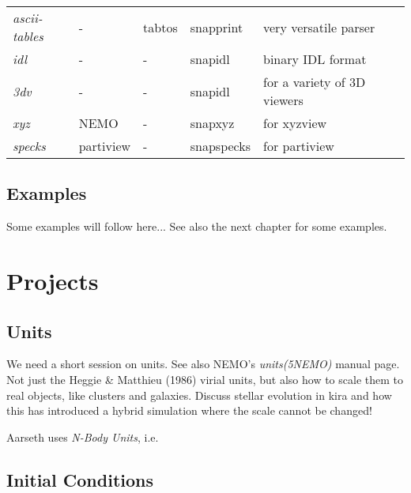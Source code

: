 \begin{center}
\begin{table}[h!]
\begin{tabular}{||l|l|l|l|l|l||}
{\it ascii-tables}   &   -   &  tabtos    &    snapprint     &   very versatile parser\\

{\it idl}         &    -     &     -      &    snapidl        &   binary IDL format  \\
{\it 3dv}         &    -     &     -      &    snapidl        &   for a variety of 3D viewers \\
{\it xyz}         &   NEMO    &     -      &    snapxyz        &  for xyzview \\
{\it specks}      &  partiview &     -      &    snapspecks      &  for partiview \\







\hline 




\end{tabular}
\end{table}
\end{center}

\section{Examples}

Some examples will follow here... See also the next chapter for some examples.



\chapter                {Projects}

\section{Units}

We need a short session on units. See also NEMO's {\it units(5NEMO)} manual page.
Not just the Heggie \& Matthieu (1986) virial units, but also how to scale them to
real objects, like clusters and galaxies. Discuss stellar evolution in kira
and how this has introduced a hybrid simulation where the scale cannot be
changed!

Aarseth uses {\it N-Body Units}, i.e.

\section{Initial Conditions}


